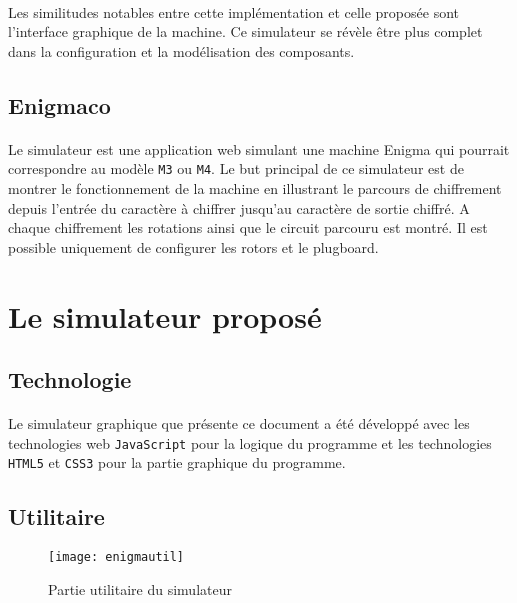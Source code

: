 \documentclass[letterpaper]{article}
\begin{document}
\paragraph{}

Les similitudes notables entre cette implémentation et celle proposée sont l'interface graphique de la machine. Ce simulateur se révèle être plus complet dans la configuration et la modélisation des composants.

\subsection{Enigmaco}

\paragraph{}

Le simulateur \cite{ECO} est une application web simulant une machine Enigma qui pourrait correspondre au modèle \texttt{M3} ou \texttt{M4}. Le but principal de ce simulateur est de montrer le fonctionnement de la machine en illustrant le parcours de chiffrement depuis l'entrée du caractère à chiffrer jusqu'au caractère de sortie chiffré. A chaque chiffrement les rotations ainsi que le circuit parcouru est montré. Il est possible uniquement de configurer les rotors et le plugboard.

\section{Le simulateur proposé}

\subsection{Technologie}

\paragraph{}
Le simulateur graphique que présente ce document a été développé avec les technologies web \texttt{JavaScript} pour la logique du programme et les technologies \texttt{HTML5} et \texttt{CSS3} pour la partie graphique du programme.

\subsection{Utilitaire}

\begin{figure}
    \centering
    \texttt{[image: enigmautil]}
    \caption{Partie utilitaire du simulateur}
    \label{fig:enigmautil}
\end{figure}
\end{document}
